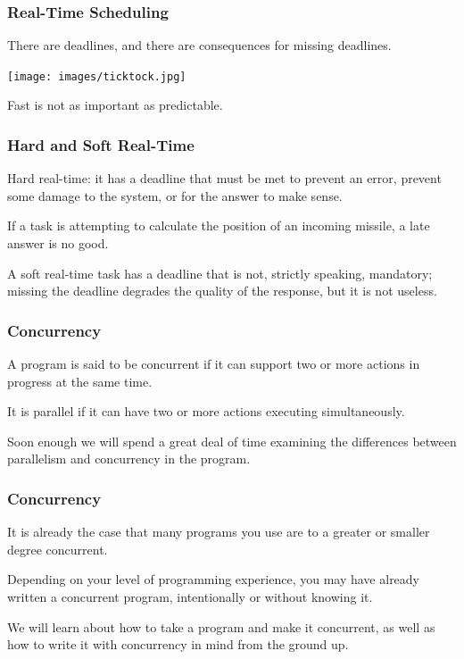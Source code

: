 \begin{frame}
\frametitle{Real-Time Scheduling}

There are deadlines, and there are consequences for missing deadlines. 

\begin{center}
	\texttt{[image: images/ticktock.jpg]}
\end{center}

Fast is not as important as predictable.

\end{frame}

\begin{frame}
\frametitle{Hard and Soft Real-Time}

\alert{Hard real-time}: it has a deadline that must be met to prevent an error, prevent some damage to the system, or for the answer to make sense. 

If a task is attempting to calculate the position of an incoming missile, a late answer is no good. 

A \alert{soft real-time} task has a deadline that is not, strictly speaking, mandatory; missing the deadline degrades the quality of the response, but it is not useless.


\end{frame}


\begin{frame}
	\frametitle{Concurrency}
	A program is said to be concurrent if it can support two or more actions in progress at the same time.

	It is parallel if it can have two or more actions executing simultaneously.

	Soon enough we will spend a great deal of time examining the differences between parallelism and concurrency in the program.

\end{frame}

\begin{frame}
	\frametitle{Concurrency}

	It is already the case that many programs you use are to a greater or smaller degree concurrent.

	Depending on your level of programming experience, you may have already written a concurrent program, intentionally or without knowing it.

	We will learn about how to take a program and make it concurrent, as well as how to write it with concurrency in mind from the ground up.

\end{frame}


